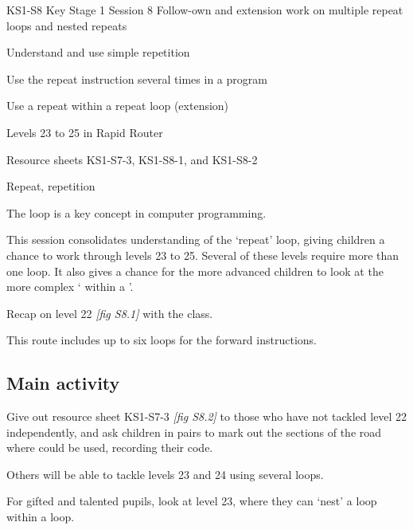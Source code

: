 \documentclass{../../../lessonplan}
\begin{document}
\lessonplantitle
    {KS1-S8}
    {Key Stage 1 Session 8}
    {Follow-own and extension work on multiple repeat loops and nested repeats}

\preamble
    {
    \item Understand and use simple repetition
    \item Use the repeat instruction several times in a program
    \item Use a repeat within a repeat loop (extension)
    }
    {
    \item Levels 23 to 25 in Rapid Router  
    \item Resource sheets KS1-S7-3, KS1-S8-1, and KS1-S8-2
    }
    {
    \item Repeat, repetition
    }

\begin{lessonplan}

The  loop is a key concept in computer programming.

This session consolidates understanding of the `repeat' loop, giving children a chance to work through levels 23 to 25.
Several of these levels require more than one  loop.
It also gives a chance for the more advanced children to look at the more complex ` within a '.

Recap on level 22 \textit{[fig S8.1]} with the class.



This route includes up to six  loops for the forward instructions.

\subsection*{Main activity}

Give out resource sheet KS1-S7-3 \textit{[fig S8.2]} to those who have not tackled level 22 independently, and ask children in pairs to mark out the sections of the road where  could be used, recording their code.


Others will be able to tackle levels 23 and 24 using several  loops.

For gifted and talented pupils, look at level 23, where they can `nest' a  loop within a  loop.


\end{lessonplan}
\end{document}
